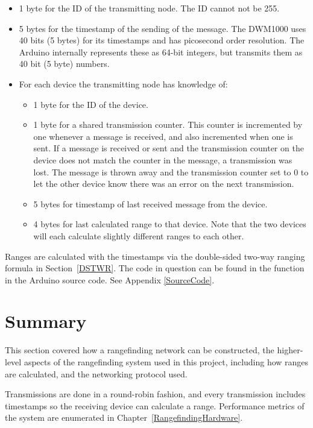 \begin{itemize}
	\item 1 byte for the ID of the transmitting node. The ID cannot not be 255.
	\item 5 bytes for the timestamp of the sending of the message. The DWM1000 uses 40 bits (5 bytes) for its timestamps and has picosecond order resolution. The Arduino internally represents these as 64-bit integers, but transmits them as 40 bit (5 byte) numbers.
	\item For each device the transmitting node has knowledge of:
	\begin{itemize}
		\item 1 byte for the ID of the device.
		\item 1 byte for a shared transmission counter. This counter is incremented by one whenever a message is received, and also incremented when one is sent. If a message is received or sent and the transmission counter on the device does not match the counter in the message, a transmission was lost. The message is thrown away and the transmission counter set to 0 to let the other device know there was an error on the next transmission.
		\item 5 bytes for timestamp of last received message from the device.
		\item 4 bytes for last calculated range to that device. Note that the two devices will each calculate slightly different ranges to each other.
	\end{itemize} 
\end{itemize}

Ranges are calculated with the timestamps via the double-sided two-way ranging formula in Section~\ref{DSTWR}. The code in question can be found in the  function in the Arduino source code. See Appendix \ref{SourceCode}.

\section{Summary}
This section covered how a rangefinding network can be constructed, the higher-level aspects of the rangefinding system used in this project, including how ranges are calculated, and the networking protocol used.

Transmissions are done in a round-robin fashion, and every transmission includes timestamps so the receiving device can calculate a range. Performance metrics of the system are enumerated in Chapter~\ref{RangefindingHardware}.
